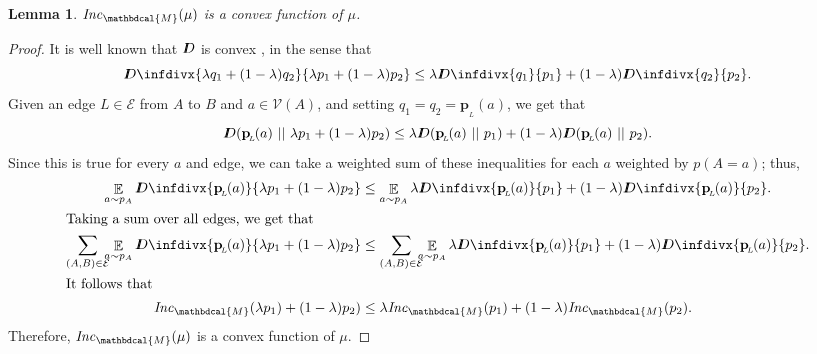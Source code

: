 \documentclass[letterpaper]{article} %
\theoremstyle{plain}
\newtheorem{lemma}[theorem]{Lemma}
\theoremstyle{definition}
\theoremstyle{remark}
\DeclareMathOperator*{\Ex}{\mathbb{E}} %
\newcommand\mat[1]{\mathbf{#1}}
\newcommand{\thickD}{I\mkern-8muD}
\newcommand{\kldiv}{\thickD\infdivx}
\newcommand{\bp}[1][L]{\mat{p}_{\!_{#1}\!}}
\newcommand{\Ed}{\mathcal E}
\newcommand{\dg}[1]{\mathbdcal{#1}}
\newcommand\Inc{\mathit{Inc}}
\begin{document}
\begin{lemma}
	\label{thm:inc-convex}
	$\Inc_{\dg M}( \mu)$ is a convex function of $\mu$.
\end{lemma}
\begin{proof}
    It is well known that $\thickD$ is convex \cite[Theorem
            2.7.2]{coverThomas}, in the sense that  
	\[ \kldiv{\lambda q_1 + (1-\lambda) q_2 }{ \lambda p_1
			  + (1-\lambda) p_2} \leq \lambda \kldiv {q_1}{ p_1} +
							(1-\lambda) \kldiv{q_2}{p_2}. \] 
Given an edge $L \in \Ed$ from $A$ to $B$ and $a \in \mathcal V(A)$,
and   
setting $q_1 = q_2 = \bp(a)$, we get that
	\[ \thickD(\bp(a) \ ||\ \lambda p_1 + (1-\lambda) p_2)
			\leq \lambda \thickD (\bp(a) \ ||\ p_1) + (1-\lambda)
							\thickD(\bp(a)\ ||\ p_2). \] 
	Since this is true for every $a$ and edge, we can take
		   a weighted sum of these inequalities for each $a$
		   weighted by $p(A=a)$; thus, 
	\begin{align*}
		\Ex_{a\sim p_A} \kldiv{\bp(a)}{\lambda p_1 +
			(1-\lambda) p_2} &\leq 
			 \Ex_{a\sim p_A}\lambda \kldiv {\bp(a)}{p_1} +
											(1-\lambda)
                         			 \kldiv{\bp(a)}{p_2}. \\
                        \intertext{Taking a sum over all edges, we get
                        that}
					\sum_{(A, B) \in \Ed}\mskip-10mu\Ex_{a\sim p_A} \kldiv{\bp(a) }{\lambda p_1 + (1-\lambda) p_2} 
			&\leq \sum_{(A, B) \in
							  \Ed}\mskip-10mu\Ex_{a\sim p_A}\lambda
							\kldiv{\bp(a)}{p_1} + (1-\lambda)
							\kldiv{\bp(a)}{p_2}. \\
    \shortintertext{It follows that} 
		\Inc_{\dg M}( \lambda p_1) + (1-\lambda)p_2)
					&\leq \lambda \Inc_{\dg M}(p_1) + (1-\lambda)
					\Inc_{\dg M}(p_2). 
	\end{align*}
	Therefore, $\Inc_{\dg M}( \mu)$ is a convex function of $\mu$.
\end{proof}
\end{document}
